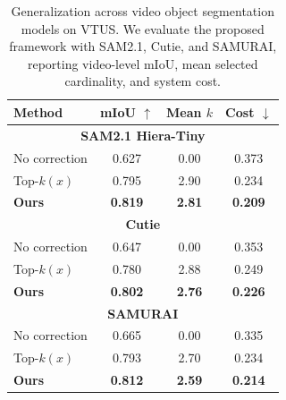 \begin{table}[t]
\centering
\caption{Generalization across video object segmentation models
on VTUS. We evaluate the proposed framework with SAM2.1,
Cutie, and SAMURAI, reporting video-level mIoU, mean selected
cardinality, and system cost.}
\label{tab:vtus_vos_model_generalization}
\small
\begin{tabular}{@{}lccc@{}}
\toprule
\textbf{Method} & \textbf{mIoU} $\uparrow$ & \textbf{Mean $k$} & \textbf{Cost} $\downarrow$ \\
\midrule
\multicolumn{4}{c}{\textbf{SAM2.1 Hiera-Tiny}} \\
\midrule
No correction & 0.627 & 0.00 & 0.373 \\
Top-$k(x)$ & 0.795 & 2.90 & 0.234 \\
\textbf{Ours} & \textbf{0.819} & \textbf{2.81} & \textbf{0.209} \\
\midrule
\multicolumn{4}{c}{\textbf{Cutie}} \\
\midrule
No correction & 0.647 & 0.00 & 0.353 \\
Top-$k(x)$ & 0.780 & 2.88 & 0.249 \\
\textbf{Ours} & \textbf{0.802} & \textbf{2.76} & \textbf{0.226} \\
\midrule
\multicolumn{4}{c}{\textbf{SAMURAI}} \\
\midrule
No correction & 0.665 & 0.00 & 0.335 \\
Top-$k(x)$ & 0.793 & 2.70 & 0.234 \\
\textbf{Ours} & \textbf{0.812} & \textbf{2.59} & \textbf{0.214} \\
\bottomrule
\end{tabular}
\end{table}

